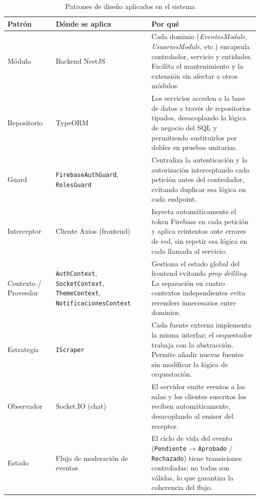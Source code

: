\begin{table}[H]
\centering
\caption{Patrones de diseño aplicados en el sistema}
\label{tab:patrones}
\renewcommand{\arraystretch}{1.2}
\begin{tabular}{|
>{\raggedright\arraybackslash}p{}|
>{\raggedright\arraybackslash}p{}|
>{\raggedright\arraybackslash}p{}|}
\hline
\textbf{Patrón} & \textbf{Dónde se aplica} & \textbf{Por qué} \\
\hline
Módulo & Backend NestJS & Cada dominio (\textit{EventosModule}, \textit{UsuariosModule}, etc.) encapsula controlador, servicio y entidades. Facilita el mantenimiento y la extensión sin afectar a otros módulos. \\
\hline
Repositorio~\cite{fowler2002peaa} & TypeORM & Los servicios acceden a la base de datos a través de repositorios tipados, desacoplando la lógica de negocio del SQL y permitiendo sustituirlos por dobles en pruebas unitarias. \\
\hline
Guard & \texttt{FirebaseAuthGuard}, \texttt{RolesGuard} & Centraliza la autenticación y la autorización interceptando cada petición antes del controlador, evitando duplicar esa lógica en cada endpoint. \\
\hline
Interceptor & Cliente Axios (frontend) & Inyecta automáticamente el token Firebase en cada petición y aplica reintentos ante errores de red, sin repetir esa lógica en cada llamada al servicio. \\
\hline
Contexto / Proveedor & \texttt{AuthContext}, \texttt{SocketContext}, \texttt{ThemeContext}, \texttt{Notificaciones\allowbreak{}Context} & Gestiona el estado global del frontend evitando \textit{prop drilling}. La separación en cuatro contextos independientes evita rerenders innecesarios entre dominios. \\
\hline
Estrategia & \texttt{IScraper} & Cada fuente externa implementa la misma interfaz; el orquestador trabaja con la abstracción. Permite añadir nuevas fuentes sin modificar la lógica de orquestación. \\
\hline
Observador & Socket.IO (chat) & El servidor emite eventos a las salas y los clientes suscritos los reciben automáticamente, desacoplando al emisor del receptor. \\
\hline
Estado & Flujo de moderación de eventos & El ciclo de vida del evento (\texttt{Pendiente} → \texttt{Aprobado} / \texttt{Rechazado}) tiene transiciones controladas; no todas son válidas, lo que garantiza la coherencia del flujo. \\
\hline
\end{tabular}
\end{table}

